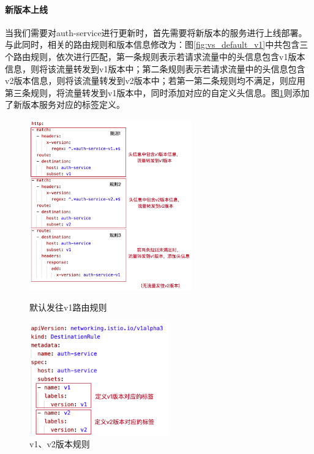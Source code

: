 \documentclass[a4paper, 12pt]{article}
\theoremstyle{definition}
\begin{document}
\paragraph{新版本上线}
当我们需要对auth-service进行更新时，首先需要将新版本的服务进行上线部署。与此同时，相关的路由规则和版本信息修改为：图\ref{fig:vs_default_v1}中共包含三个路由规则，依次进行匹配，第一条规则表示若请求流量中的头信息包含v1版本信息，则将该流量转发到v1版本中；第二条规则表示若请求流量中的头信息包含v2版本信息，则将该流量转发到v2版本中；若第一第二条规则均不满足，则应用第三条规则，将流量转发到v1版本中，同时添加对应的自定义头信息。图\ref{fig:dr_v1v2}则添加了新版本服务对应的标签定义。
\begin{figure}[htbp]
\centering
\begin{minipage}[t]{0.48\textwidth}
\centering
\centerline{\includegraphics[width=7cm]{vs_default_v1.png}}
\caption{默认发往v1路由规则}
\label{fig:vs_default_v1}
\end{minipage}
\begin{minipage}[t]{0.48\textwidth}
\centering
\centerline{\includegraphics[width=6cm]{dr_v1v2.png}}
\caption{v1、v2版本规则}
\label{fig:dr_v1v2}
\end{minipage}
\end{figure}
\end{document}

